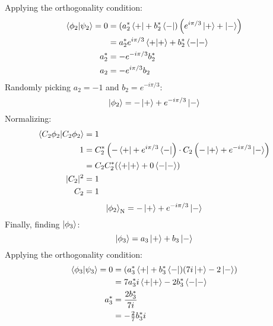 \documentclass[11pt]{article}
\newcommand\abs[1]{\lvert#1\rvert}
\begin{document}
\begin{enumerate}[label=\textbf{\arabic*.}, start=2]
{\begin{enumerate}[label=\textbf{(\alph*)}]
{                    Applying the orthogonality condition:
                    \begin{align*}
                        \braket{\phi_2|\psi_2}=0&=(a_2^*\bra{+}+b_2^*\bra{-})\left(e^{i\pi/3}\ket{+}+\ket{-}\right) \\
                        &=a_2^*e^{i\pi/3}\braket{+|+}+b_2^*\braket{-|-} \\
                        a_2^*&=-e^{-i\pi/3}b_2^* \\
                        a_2&=-e^{i\pi/3}b_2
                    \end{align*}
                    Randomly picking \(a_2=-1\) and \(b_2=e^{-i\pi/3}\):
                    \begin{equation*}
                        \ket{\phi_2}=-\ket{+}+e^{-i\pi/3}\ket{-}
                    \end{equation*}
                    Normalizing:
                    \begin{align*}
                        \braket{C_2\phi_2|C_2\phi_2}&=1 \\
                        1&=C_2^*\left(-\bra{+}+e^{i\pi/3}\bra{-}\right)\cdot C_2\left(-\ket{+}+e^{-i\pi/3}\ket{-}\right) \\
                        &=C_2C_2^*(\braket{+|+}+0\braket{-|-}) \\
                        \abs{C_2}^2&=1 \\
                        C_2&=1
                    \end{align*}
                    \begin{equation*}
                        \ket{\phi_2}_\mathrm{N}=-\ket{+}+e^{-i\pi/3}\ket{-}
                    \end{equation*}
                    Finally, finding \(\ket{\phi_3}\):
                    \begin{equation*}
                        \ket{\phi_3}=a_3\ket{+}+b_3\ket{-}
                    \end{equation*}
                    Applying the orthogonality condition:
                    \begin{align*}
                        \braket{\phi_3|\psi_3}=0&=(a_3^*\bra{+}+b_3^*\bra{-})(7i\ket{+}-2\ket{-}) \\
                        &=7a_3^*i\braket{+|+}-2b_3^*\braket{-|-} \\
                        a_3^*&=\frac{2b_3^*}{7i} \\
                        &=-\tfrac 2 7 b_3^*i \\

\end{align*}}
\end{enumerate}}
\end{enumerate}
\end{document}
